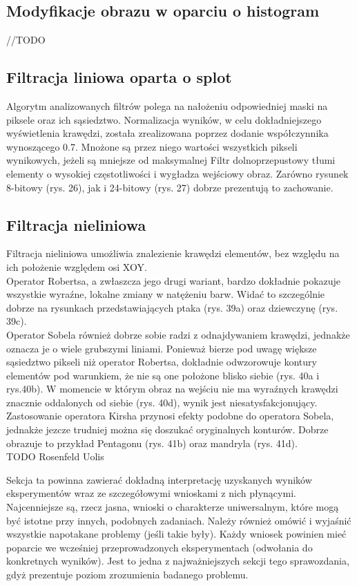 \documentclass{classrep}
\begin{document}
\subsection{Modyfikacje obrazu w oparciu o histogram}
//TODO

\subsection{Filtracja liniowa oparta o splot}
\noindent
Algorytm analizowanych filtrów polega na nałożeniu odpowiedniej maski na piksele oraz ich sąsiedztwo. Normalizacja wyników, w celu dokładniejszego wyświetlenia krawędzi, została zrealizowana poprzez dodanie współczynnika wynoszącego 0.7. Mnożone są przez niego wartości wszystkich pikseli wynikowych, jeżeli są mniejsze od maksymalnej 
Filtr dolnoprzepustowy tłumi elementy o wysokiej częstotliwości i wygładza wejściowy obraz. Zarówno rysunek 8-bitowy (rys. 26), jak i 24-bitowy (rys. 27) dobrze prezentują to zachowanie.\\


\subsection{Filtracja nieliniowa}
\noindent
Filtracja nieliniowa umożliwia znalezienie krawędzi elementów, bez względu na ich położenie względem osi XOY.\\
Operator Robertsa, a zwłaszcza jego drugi wariant, bardzo dokładnie pokazuje wszystkie wyraźne, lokalne zmiany w natężeniu barw. Widać to szczególnie dobrze na rysunkach przedstawiających ptaka (rys. 39a) oraz dziewczynę (rys. 39c).\\
Operator Sobela również dobrze sobie radzi z odnajdywaniem krawędzi, jednakże oznacza je o wiele grubszymi liniami. Ponieważ bierze pod uwagę większe sąsiedztwo pikseli niż operator Robertsa, dokładnie odwzorowuje kontury elementów pod warunkiem, że nie są one położone blisko siebie (rys. 40a i rys.40b). W momencie w którym obraz na wejściu nie ma wyraźnych krawędzi znacznie oddalonych od siebie (rys. 40d), wynik jest niesatysfakcjonujący.\\
Zastosowanie operatora Kirsha przynosi efekty podobne do operatora Sobela, jednakże jezcze trudniej można się doszukać oryginalnych konturów. Dobrze obrazuje to przykład Pentagonu (rys. 41b) oraz mandryla (rys. 41d).\\

TODO Rosenfeld Uolis

{\color{blue}


Sekcja ta powinna zawierać dokładną interpretację uzyskanych wyników
eksperymentów wraz ze szczegółowymi wnioskami z nich płynącymi. Najcenniejsze
są, rzecz jasna, wnioski o charakterze uniwersalnym, które mogą być istotne
przy innych, podobnych zadaniach. Należy również omówić i wyjaśnić wszystkie
napotakane problemy (jeśli takie były). Każdy wniosek powinien mieć poparcie
we wcześniej przeprowadzonych eksperymentach (odwołania do konkretnych
wyników). Jest to jedna z najważniejszych sekcji tego sprawozdania, gdyż
prezentuje poziom zrozumienia badanego problemu.}
\end{document}
